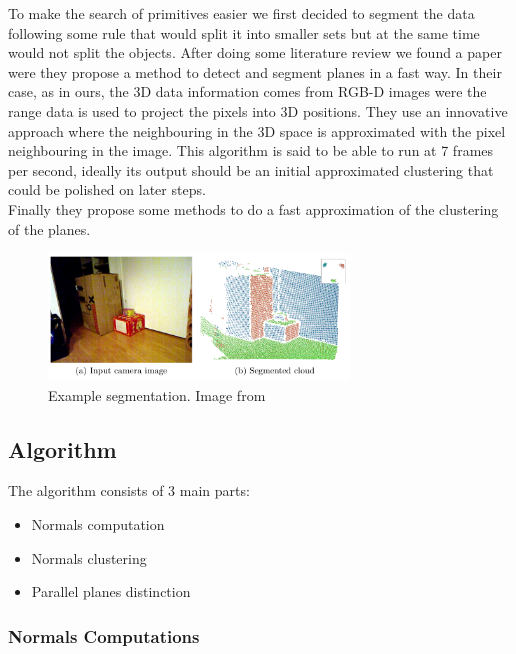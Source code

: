 \documentclass[fontsize=12pt]{article}
\begin{document}
To make the search of primitives easier we first decided to segment the data following some rule that would split it into smaller sets but at the same time would not split the objects. After doing some literature review we found a paper \cite{bib:planes_paper} were they propose a method to detect and segment planes in a fast way. In their case, as in ours, the 3D data information comes from RGB-D images were the range data is used to project the pixels into 3D positions. They use an innovative approach where the neighbouring in the 3D space is approximated with the pixel neighbouring in the image. This algorithm is said to be able to run at 7 frames per second, ideally its output should be an initial approximated clustering that could be polished on later steps.\\

Finally they propose some methods to do a fast approximation of the clustering of the planes.\\

\begin{figure}[!htbp]
  \begin{center}
    \includegraphics[width=8cm]{./images/segmentation_result.png}
    \caption{Example segmentation. Image from \cite{bib:planes_paper}}
    \label{fig:example_segmentation}
  \end{center}
\end{figure}

\subsection{Algorithm}
\label{sub:plane_algorithm}

The algorithm consists of 3 main parts:

\begin{itemize}
  \item Normals computation
  \item Normals clustering
  \item Parallel planes distinction
\end{itemize}




\subsubsection{Normals Computations}
\end{document}
